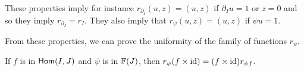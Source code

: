 


These properties imply for instance $r_{\partial_I}(u,z) = (u,z)$ if
$\partial_I u = 1$ or $z=0$ and so they imply $r_{\partial_I} = r_I$.
They also imply that $r_{\psi}(u,z) = (u,z)$ if $\psi u = 1$.

\medskip

From these properties, we can prove the uniformity of the family of
functions $r_{\psi}$.

\begin{theorem}
  If $f$ is in ${\sf Hom}(I,J)$ and $\psi$ is in $\mathbb{F}(J)$, then
  $r_{\psi}(f\times\mathrm{id}) = (f\times\mathrm{id})r_{\psi f}$.
\end{theorem}

